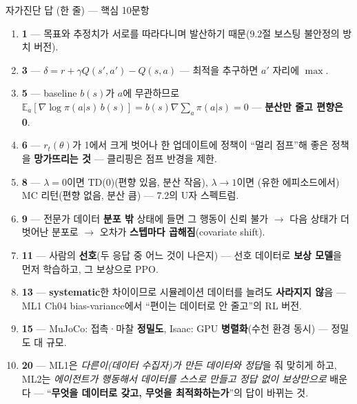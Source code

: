 \documentclass[aspectratio=169,11pt]{beamer}
\begin{document}
\begin{frame}{자가진단 답 (한 줄) — 핵심 10문항}
  \scriptsize
  \begin{enumerate}
    \item \textbf{1} — 목표와 추정치가 서로를 따라다니며 발산하기
      때문(9.2절 보스팅 불안정의 방치 버전).
    \item \textbf{3} — $\delta = r + \gamma Q(s',a') - Q(s,a)$ —
      최적을 추구하면 $a'$ 자리에 $\max$.
    \item \textbf{5} — baseline $b(s)$가 $a$에 무관하므로
      $\mathbb{E}_a[\nabla \log \pi(a|s)\, b(s)] = b(s)\nabla
      \sum_a \pi(a|s) = 0$ — \textbf{분산만 줄고 편향은 0}.
    \item \textbf{6} — $r_t(\theta)$가 1에서 크게 벗어나 한
      업데이트에 정책이 ``멀리 점프''해 좋은 정책을 \textbf{망가뜨리는
      것} — 클리핑은 점프 반경을 제한.
    \item \textbf{8} — $\lambda=0$이면 TD(0)(편향 있음, 분산 작음),
      $\lambda\to 1$이면 (유한 에피소드에서) MC 리턴(편향 없음,
      분산 큼) — 7.2의 U자 스펙트럼.
    \item \textbf{9} — 전문가 데이터 \textbf{분포 밖} 상태에 들면 그
      행동이 신뢰 불가 $\to$ 다음 상태가 더 벗어난 분포로 $\to$
      오차가 \textbf{스텝마다 곱해짐}(covariate shift).
    \item \textbf{11} — 사람의 \textbf{선호}(두 응답 중 어느 것이
      나은지) — 선호 데이터로 \textbf{보상 모델}을 먼저 학습하고, 그
      보상으로 PPO.
    \item \textbf{13} — \textbf{systematic}한 차이이므로 시뮬레이션
      데이터를 늘려도 \textbf{사라지지 않}음 — ML1 Ch04
      bias-variance에서 ``편이는 데이터로 안 줄고''의 RL 버전.
    \item \textbf{15} — MuJoCo: 접촉·마찰 \textbf{정밀도}, Isaac: GPU
      \textbf{병렬화}(수천 환경 동시) — 정밀도 대 규모.
    \item \textbf{20} — ML1은 \emph{다른이(데이터 수집자)가 만든
      데이터와 정답}을 줘 맞히게 하고, ML2는 \emph{에이전트가
      행동해서 데이터를 스스로 만들고 정답 없이 보상만으로} 배운다 —
      ``\textbf{무엇을 데이터로 갖고, 무엇을 최적화하는가}''의
      답이 바뀌는 것.
  \end{enumerate}
\end{frame}
\end{document}
